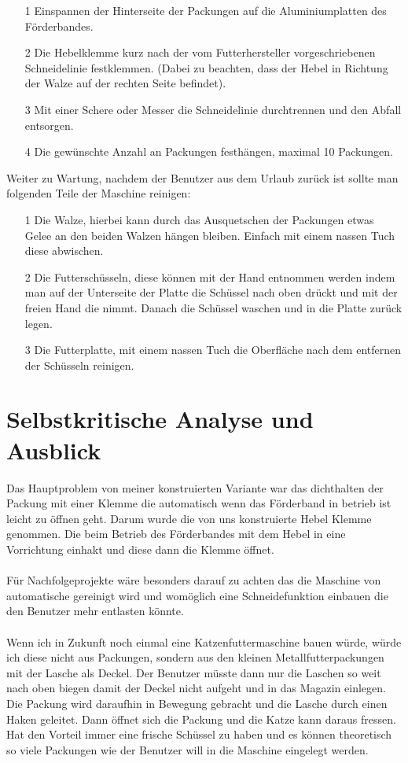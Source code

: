 \begin{itemize}
\item[1] Einspannen der Hinterseite der Packungen auf die Aluminiumplatten des Förderbandes. 
\item[2] Die Hebelklemme kurz nach der vom Futterhersteller vorgeschriebenen Schneidelinie festklemmen. (Dabei zu beachten, dass der Hebel in Richtung der Walze auf der rechten Seite befindet).
\item[3] Mit einer Schere oder Messer die Schneidelinie durchtrennen und den Abfall entsorgen.
\item[4] Die gewünschte Anzahl an Packungen festhängen, maximal 10 Packungen.
\end{itemize} 

Weiter zu Wartung, nachdem der Benutzer aus dem Urlaub zurück ist sollte man folgenden Teile der Maschine reinigen: 

\begin{itemize}
\item[1] Die Walze, hierbei kann durch das Ausquetschen der Packungen etwas Gelee an den beiden Walzen hängen bleiben. Einfach mit einem nassen Tuch diese abwischen.
\item[2] Die Futterschüsseln, diese können mit der Hand entnommen werden indem man auf der Unterseite der Platte die Schüssel nach oben drückt und mit der freien Hand die nimmt. Danach die Schüssel waschen und in die Platte zurück legen.
\item[3] Die Futterplatte, mit einem nassen Tuch die Oberfläche nach dem entfernen der Schüsseln reinigen.
\end{itemize}


\section{Selbstkritische Analyse und Ausblick}

Das Hauptproblem von meiner konstruierten Variante war das dichthalten der Packung mit einer Klemme die automatisch wenn das Förderband in betrieb ist leicht zu öffnen geht. Darum wurde die von uns konstruierte Hebel Klemme genommen. Die beim Betrieb des Förderbandes mit dem Hebel in eine Vorrichtung einhakt und diese dann die Klemme öffnet. \\
\\
Für Nachfolgeprojekte wäre besonders darauf zu achten das die Maschine von automatische gereinigt wird und womöglich eine Schneidefunktion einbauen die den Benutzer mehr entlasten könnte.\\
\\
Wenn ich in Zukunft noch einmal eine Katzenfuttermaschine bauen würde, würde ich diese nicht aus Packungen, sondern aus den kleinen Metallfutterpackungen mit der Lasche als Deckel. Der Benutzer müsste dann nur die Laschen so weit nach oben biegen damit der Deckel nicht aufgeht und in das Magazin einlegen. Die Packung wird daraufhin in Bewegung gebracht und die Lasche durch einen Haken geleitet. Dann öffnet sich die Packung und die Katze kann daraus fressen. Hat den Vorteil immer eine frische Schüssel zu haben und es können theoretisch so viele Packungen wie der Benutzer will in die Maschine eingelegt werden. \\
 
